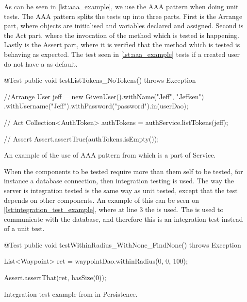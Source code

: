 As can be seen in \cref{lst:aaa_example}, we use the \ac{AAA} pattern when doing unit tests.
The \ac{AAA} pattern splits the tests up into three parts.
First is the Arrange part, where objects are initialised and variables declared and assigned.
Second is the Act part, where the invocation of the method which is tested is happening.
Lastly is the Assert part, where it is verified that the method which is tested is behaving as expected.\cite{aaa_pattern}
The test seen in \cref{lst:aaa_example} tests if a created user do not have a  as default.

\begin{listing}
    \begin{java2}
        @Test
        public void testListTokens_NoTokens() throws Exception {
            //Arrange
            User jeff = new GivenUser().withName("Jeff", "Jeffsen")
                .withUsername("Jeff").withPassword("password").in(userDao);

            // Act
            Collection<AuthToken> authTokens = authService.listTokens(jeff);

            // Assert
            Assert.assertTrue(authTokens.isEmpty());
        }
    \end{java2}
    \caption{An example of the use of \ac{AAA} pattern from  which is a part of Service.}
    \label{lst:aaa_example}
\end{listing}

\bigskip

When the components to be tested require more than them self to be tested,
for instance a database connection,
then integration testing is used.
The way the server is integration tested is the same way as unit tested,
except that the test depends on other components.
An example of this can be seen on \cref{lst:integration_test_example},
where at line 3 the  is used.
The  is used to communicate with the database,
and therefore this is an integration test instead of a unit test.

\begin{listing}
    \begin{java2}
        @Test
        public void testWithinRadius_WithNone_FindNone() throws Exception {
            List<Waypoint> ret = waypointDao.withinRadius(0, 0, 100);

            Assert.assertThat(ret, hasSize(0));
        }
    \end{java2}
    \caption{Integration test example from  in Persistence.}
    \label{lst:integration_test_example}
\end{listing}

